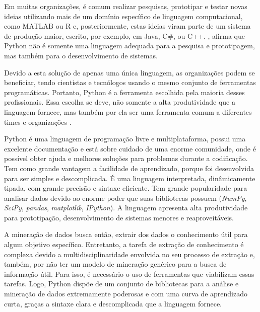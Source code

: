 Em muitas organizações, é comum realizar pesquisas, prototipar e testar novas ideias utilizando mais de um domínio específico de linguagem computacional, como MATLAB ou R e, posteriormente, estas ideias viram parte de um sistema de produção maior, escrito, por exemplo, em Java, C\#, ou C++. , afirma que Python não é somente uma linguagem adequada para a pesquisa e prototipagem, mas também para o desenvolvimento de sistemas.

Devido a esta solução de apenas uma única linguagem, as organizações podem se beneficiar, tendo cientistas e tecnólogos usando o mesmo conjunto de ferramentas programáticas. Portanto, Python é a ferramenta escolhida pela maioria desses profissionais. Essa escolha se deve, não somente a alta produtividade que a linguagem fornece, mas também por ela ser uma ferramenta comum a diferentes times e organizações \cite{kaldero}. 

Python é uma linguagem de programação livre e multiplataforma, possui uma excelente documentação e está sobre cuidado de uma enorme comunidade, onde é possível obter ajuda e melhores soluções para problemas durante a codificação. Tem como grande vantagem a facilidade de aprendizado, porque foi desenvolvida para ser simples e descomplicada. É uma linguagem interpretada, dinâmicamente tipada, com grande precisão e sintaxe eficiente. Tem grande popularidade para analisar dados devido ao enorme poder que suas bibliotecas possuem (\textit{NumPy}, \textit{SciPy}, \textit{pandas}, \textit{matplotlib}, \textit{IPython}). A linguagem apresenta alta produtividade para prototipação, desenvolvimento de sistemas menores e reaproveitáveis.

A mineração de dados busca então, extrair dos dados o conhecimento útil para algum objetivo específico. Entretanto, a tarefa de extração de conhecimento é complexa devido a multidisciplinaridade envolvida no seu processo de extração e, também, por não ter um modelo de mineração genérico para a busca de informação útil. Para isso, é necessário o uso de ferramentas que viabilizam essas tarefas. Logo, Python dispõe de um conjunto de bibliotecas para a análise e mineração de dados extremamente poderosas e com uma curva de aprendizado curta, graças a sintaxe clara e descomplicada que a linguagem fornece.


